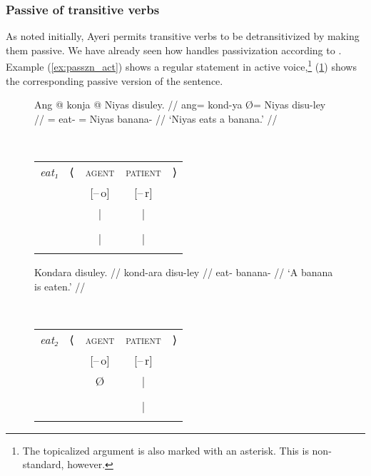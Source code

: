 \subsubsection{Passive of transitive verbs}

As noted initially, Ayeri permits transitive verbs to be detransitivized by
making them passive. We have already seen how \Lfg{} handles passivization
according to \citet{bresnan2016}. Example (\ref{ex:passzn_act}) shows a regular
statement in active voice,\footnote{The topicalized argument is also marked
with an asterisk. This is non-standard, however.} (\ref{ex:passzn_pass}) shows
the corresponding passive version of the sentence.

\begin{figure}
\pex\label{ex:passzn}
\a\label{ex:passzn_act}%
\begin{minipage}[t]{.5\remaining}
\begingl
	\gla Ang @ konja {} @ Niyas disuley. //
	\glb ang= kond-ya Ø= Niyas disu-ley //
	\glc \AgtT{}= eat-\TsgM{} \Top{}= Niyas banana-\PargI{} //
	\glft `Niyas eats a banana.' //
\endgl
\end{minipage}
~
\begin{tabular}[t]{>{\itshape}l l c c r}
eat₁
	& ⟨
	& \textsc{agent}
	& \textsc{patient}
	& ⟩
	\\
%
	& %
	& [–\,o]
	& [–\,r]
	& %
	\\

%
	& %
	& |
	& |
	& %
	\\

%
	& %
	& \Subj*
	& \Obj
	& %
	\\

%
	& %
	& |
	& |
	& %
	\\

%
	& %
	& \fw{Niyas}
	& \fw{banana}
	& %
	\\
\end{tabular}

\a\label{ex:passzn_pass}%
\begin{minipage}[t]{.5\remaining}
\begingl
	\gla Kondara disuley. //
	\glb kond-ara disu-ley //
	\glc eat-\TsgI{} banana-\PargI{} //
	\glft `A banana is eaten.' //
\endgl
\end{minipage}
~
\begin{tabular}[t]{>{\itshape}l l c c r}
eat₂
	& ⟨
	& \textsc{agent}
	& \textsc{patient}
	& ⟩
	\\
%
	& %
	& [–\,o]
	& [–\,r]
	& %
	\\

%
	& %
	& Ø
	& |
	& %
	\\

%
	& %
	& %
	& \Subj
	& %
	\\

%
	& %
	& %
	& |
	& %
	\\

%
	& %
	& %
	& \fw{banana}
	& %
	\\
\end{tabular}

\xe
\end{figure}

